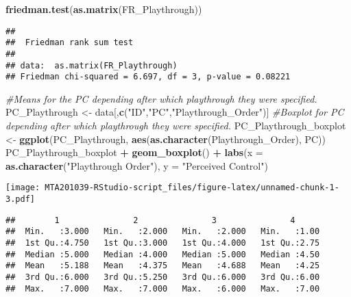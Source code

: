 \documentclass[
]{article}
\newenvironment{Shaded}{\begin{snugshade}}{\end{snugshade}}
\newcommand{\CommentTok}[1]{\textcolor[rgb]{0.56,0.35,0.01}{\textit{#1}}}
\newcommand{\DataTypeTok}[1]{\textcolor[rgb]{0.13,0.29,0.53}{#1}}
\newcommand{\KeywordTok}[1]{\textcolor[rgb]{0.13,0.29,0.53}{\textbf{#1}}}
\newcommand{\NormalTok}[1]{#1}
\newcommand{\OperatorTok}[1]{\textcolor[rgb]{0.81,0.36,0.00}{\textbf{#1}}}
\newcommand{\OtherTok}[1]{\textcolor[rgb]{0.56,0.35,0.01}{#1}}
\newcommand{\StringTok}[1]{\textcolor[rgb]{0.31,0.60,0.02}{#1}}
\begin{document}
\begin{Shaded}
\begin{Highlighting}[]
\KeywordTok{friedman.test}\NormalTok{(}\KeywordTok{as.matrix}\NormalTok{(FR_Playthrough))}
\end{Highlighting}
\end{Shaded}

\begin{verbatim}
## 
##  Friedman rank sum test
## 
## data:  as.matrix(FR_Playthrough)
## Friedman chi-squared = 6.697, df = 3, p-value = 0.08221
\end{verbatim}

\begin{Shaded}
\begin{Highlighting}[]
\CommentTok{#Means for the PC depending after which playthrough they were specified.}
\NormalTok{PC_Playthrough <-}\StringTok{ }\NormalTok{data[,}\KeywordTok{c}\NormalTok{(}\StringTok{"ID"}\NormalTok{,}\StringTok{"PC"}\NormalTok{,}\StringTok{"Playthrough_Order"}\NormalTok{)]}
\CommentTok{#Boxplot for PC depending after which playthrough they were specified.}
\NormalTok{PC_Playthrough_boxplot <-}\StringTok{ }\KeywordTok{ggplot}\NormalTok{(PC_Playthrough, }\KeywordTok{aes}\NormalTok{(}\KeywordTok{as.character}\NormalTok{(Playthrough_Order), PC))}
\NormalTok{PC_Playthrough_boxplot }\OperatorTok{+}\StringTok{ }\KeywordTok{geom_boxplot}\NormalTok{() }\OperatorTok{+}\StringTok{ }\KeywordTok{labs}\NormalTok{(}\DataTypeTok{x =} \KeywordTok{as.character}\NormalTok{(}\StringTok{"Playthrough Order"}\NormalTok{), }\DataTypeTok{y =} \StringTok{"Perceived Control"}\NormalTok{)}
\end{Highlighting}
\end{Shaded}

\texttt{[image: MTA201039-RStudio-script\_files/figure-latex/unnamed-chunk-1-3.pdf]}

\begin{Shaded}
\end{Shaded}

\begin{verbatim}
##        1               2               3               4       
##  Min.   :3.000   Min.   :2.000   Min.   :2.000   Min.   :1.00  
##  1st Qu.:4.750   1st Qu.:3.000   1st Qu.:4.000   1st Qu.:2.75  
##  Median :5.000   Median :4.000   Median :5.000   Median :4.50  
##  Mean   :5.188   Mean   :4.375   Mean   :4.688   Mean   :4.25  
##  3rd Qu.:6.000   3rd Qu.:5.250   3rd Qu.:6.000   3rd Qu.:6.00  
##  Max.   :7.000   Max.   :7.000   Max.   :6.000   Max.   :7.00
\end{verbatim}
\end{document}
